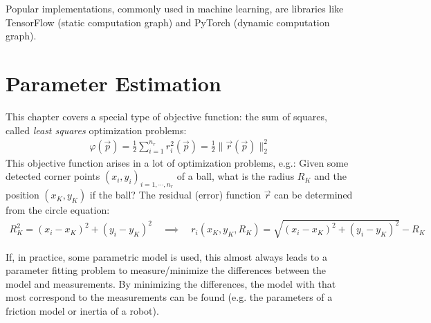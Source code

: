 		Popular implementations, commonly used in machine learning, are libraries like TensorFlow (static computation graph) and PyTorch (dynamic computation graph).

\chapter{Parameter Estimation}
	\label{c:leastSquares}

	This chapter covers a special type of objective function: the sum of squares, called \emph{least squares} optimization problems:
	\begin{align*}
		\varphi(\vec{p}) = \frac{1}{2} \sum_{i = 1}^{n_r} r_i^2(\vec{p}) = \frac{1}{2} \lVert \vec{r}(\vec{p}) \rVert_2^2
	\end{align*}
	This objective function arises in a lot of optimization problems, e.g.: Given some detected corner points \( (x_i, y_i)_{i = 1, \cdots, n_r} \) of a ball, what is the radius \(R_K\) and the position \( (x_K, y_K) \) if the ball? The residual (error) function \(\vec{r}\) can be determined from the circle equation:
	\begin{align*}
		R_K^2 = (x_i - x_K)^2 + (y_i - y_K)^2 \quad\implies\quad r_i(x_K, y_K, R_K) = \sqrt{(x_i - x_K)^2 + (y_i - y_K)^2} - R_K
	\end{align*}

	If, in practice, some parametric model is used, this almost always leads to a parameter fitting problem to measure/minimize the differences between the model and measurements. By minimizing the differences, the model with that most correspond to the measurements can be found (e.g. the parameters of a friction model or inertia of a robot).

